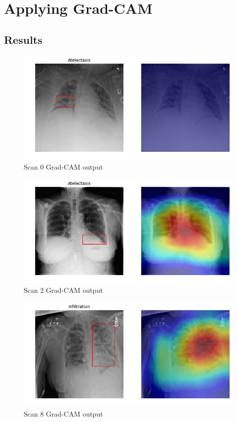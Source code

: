 \section{Applying Grad-CAM}

\subsection{Results}
\begin{figure}[!htb]
\centering
\caption{Scan 0 Grad-CAM output}
\includegraphics[width=12cm]{chapters/03_classification/images/grad-cam_0.png}
\end{figure}

\begin{figure}[!htb]
\centering
\caption{Scan 2 Grad-CAM output}
\includegraphics[width=12cm]{chapters/03_classification/images/grad-cam_2.png}
\end{figure}

\begin{figure}[!htb]
\centering
\caption{Scan 8 Grad-CAM output}
\includegraphics[width=12cm]{chapters/03_classification/images/grad-cam_8.png}
\end{figure}
